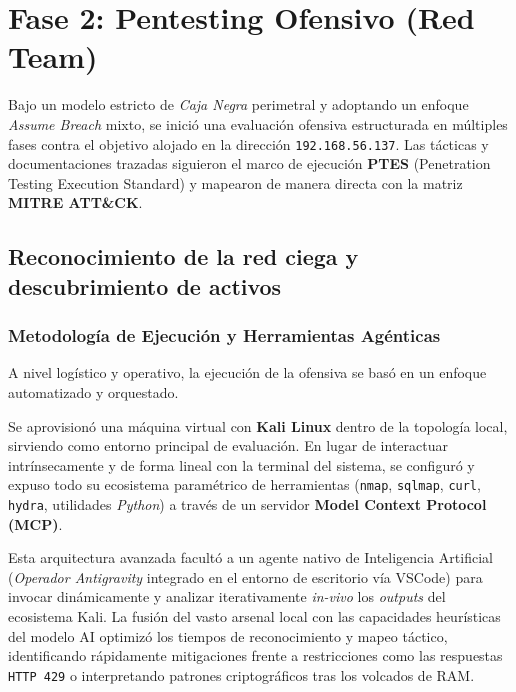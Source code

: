 \chapter[Fase 2: Pentesting Ofensivo]{Fase 2: Pentesting Ofensivo (Red Team)}
\label{chap:fase_2_pentesting_ofensivo}

Bajo un modelo estricto de \textit{Caja Negra} perimetral y adoptando un enfoque \textit{Assume Breach} mixto, se inició una evaluación ofensiva estructurada en múltiples fases contra el objetivo alojado en la dirección \texttt{192.168.56.137}. Las tácticas y documentaciones trazadas siguieron el marco de ejecución \textbf{PTES} (Penetration Testing Execution Standard) y mapearon de manera directa con la matriz \textbf{MITRE ATT\&CK}.

\section[Reconocimiento de Red y Activos]{Reconocimiento de la red ciega y descubrimiento de activos}
\label{sec:reconocimiento_red}

\subsection{Metodología de Ejecución y Herramientas Agénticas}
A nivel logístico y operativo, la ejecución de la ofensiva se basó en un enfoque automatizado y orquestado.

Se aprovisionó una máquina virtual con \textbf{Kali Linux} dentro de la topología local, sirviendo como entorno principal de evaluación. En lugar de interactuar intrínsecamente y de forma lineal con la terminal del sistema, se configuró y expuso todo su ecosistema paramétrico de herramientas (\texttt{nmap}, \texttt{sqlmap}, \texttt{curl}, \texttt{hydra}, utilidades \textit{Python}) a través de un servidor \textbf{Model Context Protocol (MCP)}. 

Esta arquitectura avanzada facultó a un agente nativo de Inteligencia Artificial (\textit{Operador Antigravity} integrado en el entorno de escritorio vía VSCode) para invocar dinámicamente y analizar iterativamente \textit{in-vivo} los \textit{outputs} del ecosistema Kali. La fusión del vasto arsenal local con las capacidades heurísticas del modelo AI optimizó los tiempos de reconocimiento y mapeo táctico, identificando rápidamente mitigaciones frente a restricciones como las respuestas \texttt{HTTP 429} o interpretando patrones criptográficos tras los volcados de RAM.

